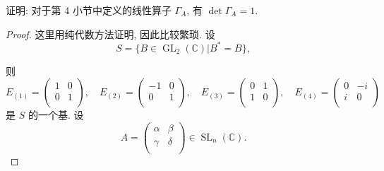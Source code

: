 \documentclass{ctexart}
\begin{document}
\begin{exercise}[4.2]
    证明: 对于第 4 小节中定义的线性算子 $\Gamma_A$, 有 $\det\Gamma_A=1$.
\end{exercise}
\begin{proof}
    这里用纯代数方法证明, 因此比较繁琐. 设
    \[S=\{B\in\operatorname{GL}_2(\mathbb{C})|B^*=B\},\]
    
    则
    \[E_{(1)}=\begin{pmatrix}
        1 & 0 \\
        0 & 1 \\
    \end{pmatrix},\quad E_{(2)}=\begin{pmatrix}
        -1 & 0 \\
        0 & 1 \\
    \end{pmatrix},\quad E_{(3)}=\begin{pmatrix}
        0 & 1 \\
        1 & 0 \\
    \end{pmatrix},\quad E_{(4)}=\begin{pmatrix}
        0 & -i \\
        i & 0 \\
    \end{pmatrix}\]
    是 $S$ 的一个基. 设
    \[A=\begin{pmatrix}
        \alpha & \beta \\
        \gamma & \delta \\
    \end{pmatrix}\in\operatorname{SL}_n(\mathbb{C}).\]


\end{proof}
\end{document}
